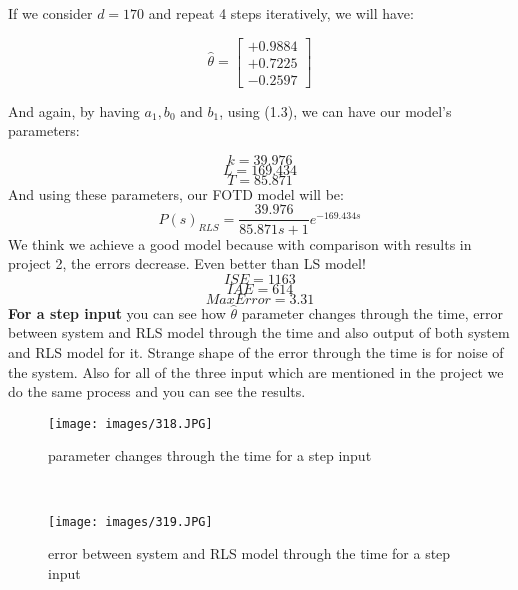 \documentclass[11pt]{scrartcl} %
\begin{document}
If we consider $d = 170$ and repeat 4 steps iteratively, we will have:

\begin{equation}
\hat{\theta}=\left[\begin{array}{l}
+0.9884 \\
+0.7225 \\
-0.2597
\end{array}\right]
\end{equation}

And again, by having $a_1, b_0$ and $b_1$, using (1.3), we can have our model's parameters:

\begin{equation}k=39.976\end{equation}
\begin{equation}L=169.434\end{equation}
\begin{equation}T=85.871\end{equation}
And using these parameters, our FOTD model will be:
\begin{equation}P(s)_{RLS}=\frac{39.976}{85.871 s+1} e^{-169.434 s}\end{equation}
We think we achieve a good model because with comparison with results in project 2, the errors decrease. Even better than LS model!
\begin{equation}ISE=1163\end{equation}
\begin{equation}IAE=614\end{equation}
\begin{equation}MaxError=3.31\end{equation}
\textbf{For a step input} you can see how $\hat{\theta}$ parameter changes through the time, error between system and RLS model through the time and also output of both system and RLS model for it. Strange shape of the error through the time is for noise of the system. Also for all of the three input which are mentioned in the project we do the same process and you can see the results.

\begin{figure}[H]
	\centering
	\texttt{[image: images/318.JPG]}
	\caption{parameter changes through the time for a step input}
\end{figure}\\

\begin{figure}[H]
	\centering
	\texttt{[image: images/319.JPG]}
	\caption{error between system and RLS model through the time for a step input}
\end{figure}\\
\end{document}
